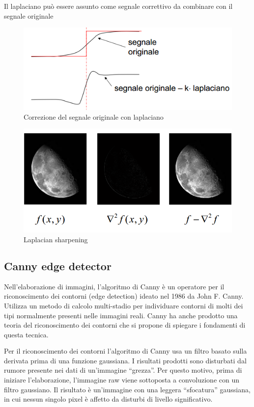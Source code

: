 Il laplaciano può essere assunto come segnale correttivo da combinare con il segnale originale

\begin{figure}[h]
\centering
\includegraphics[width=.8\textwidth]{img/laplaciano-correttivo.png}
\caption{Correzione del segnale originale con laplaciano}
\label{fig:laplaciano-correttivo}
\end{figure}

\begin{figure}[h]
\centering
\includegraphics[width=.8\textwidth]{img/laplacian-sharpening.png}
\caption{Laplacian sharpening}
\label{fig:laplacian-sharpening}
\end{figure}

\subsection{Canny edge detector}
Nell'elaborazione di immagini, l'algoritmo di Canny\cite{Canny:1986:CAE:11274.11275} è un operatore per il riconoscimento dei contorni (edge detection) ideato nel 1986 da John F. Canny. Utilizza un metodo di calcolo multi-stadio per individuare contorni di molti dei tipi normalmente presenti nelle immagini reali. Canny ha anche prodotto una teoria del riconoscimento dei contorni che si propone di spiegare i fondamenti di questa tecnica.

Per il riconoscimento dei contorni l'algoritmo di Canny usa un filtro basato sulla derivata prima di una funzione gaussiana. I risultati prodotti sono disturbati dal rumore presente nei dati di un'immagine ``grezza''. Per questo motivo, prima di iniziare l'elaborazione, l'immagine raw viene sottoposta a convoluzione con un filtro gaussiano. Il risultato è un'immagine con una leggera ``sfocatura'' gaussiana, in cui nessun singolo pixel è affetto da disturbi di livello significativo.

